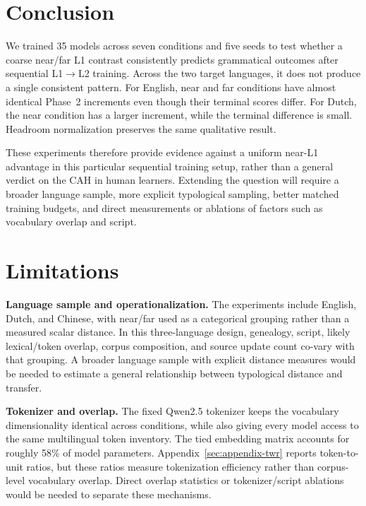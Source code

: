 \documentclass[11pt]{article}
\begin{document}
\section{Conclusion}

We trained 35 models across seven conditions and five seeds to test whether a coarse near/far L1 contrast consistently predicts grammatical outcomes after sequential L1$\rightarrow$L2 training. Across the two target languages, it does not produce a single consistent pattern. For English, near and far conditions have almost identical Phase~2 increments even though their terminal scores differ. For Dutch, the near condition has a larger increment, while the terminal difference is small. Headroom normalization preserves the same qualitative result.

These experiments therefore provide evidence against a uniform near-L1 advantage in this particular sequential training setup, rather than a general verdict on the CAH in human learners. Extending the question will require a broader language sample, more explicit typological sampling, better matched training budgets, and direct measurements or ablations of factors such as vocabulary overlap and script.


\section*{Limitations}
\label{sec:limitations}

\textbf{Language sample and operationalization.} The experiments include English, Dutch, and Chinese, with near/far used as a categorical grouping rather than a measured scalar distance. In this three-language design, genealogy, script, likely lexical/token overlap, corpus composition, and source update count co-vary with that grouping. A broader language sample with explicit distance measures would be needed to estimate a general relationship between typological distance and transfer.

\textbf{Tokenizer and overlap.} The fixed Qwen2.5 tokenizer keeps the vocabulary dimensionality identical across conditions, while also giving every model access to the same multilingual token inventory. The tied embedding matrix accounts for roughly 58\% of model parameters. Appendix~\ref{sec:appendix-twr} reports token-to-unit ratios, but these ratios measure tokenization efficiency rather than corpus-level vocabulary overlap. Direct overlap statistics or tokenizer/script ablations would be needed to separate these mechanisms.
\end{document}
